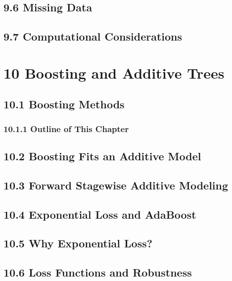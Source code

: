 \documentclass[11pt]{article}
\begin{document}
\subsection{9.6 Missing Data}\label{missing-data}

\subsection{9.7 Computational
Considerations}\label{computational-considerations}

    \section{10 Boosting and Additive
Trees}\label{boosting-and-additive-trees}

\subsection{10.1 Boosting Methods}\label{boosting-methods}

\subsubsection{10.1.1 Outline of This
Chapter}\label{outline-of-this-chapter}

\subsection{10.2 Boosting Fits an Additive
Model}\label{boosting-fits-an-additive-model}

\subsection{10.3 Forward Stagewise Additive
Modeling}\label{forward-stagewise-additive-modeling}

\subsection{10.4 Exponential Loss and
AdaBoost}\label{exponential-loss-and-adaboost}

\subsection{10.5 Why Exponential Loss?}\label{why-exponential-loss}

\subsection{10.6 Loss Functions and
Robustness}\label{loss-functions-and-robustness}
\end{document}
